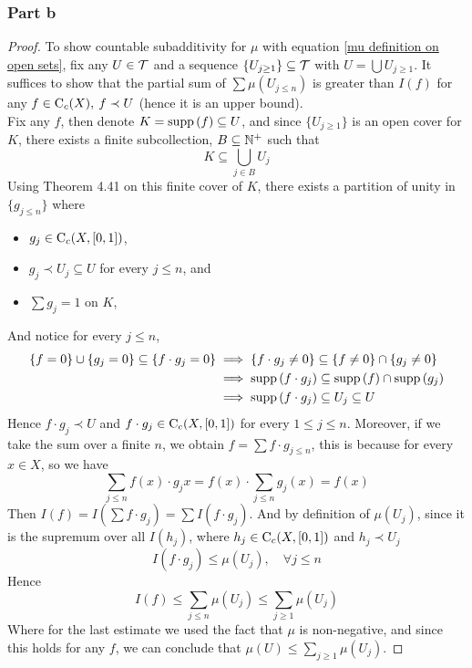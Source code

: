 \documentclass[../../main.tex]{subfiles}
\begin{document}
\subsubsection*{Part b}
\begin{proof}
To show countable subadditivity for $\mu$ with equation \eqref{mu definition on open sets}, fix any $U\in\mathcal{T}$ and a sequence $\{U_{j\geq 1}\}\subseteq \mathcal{T}$ with $U = \bigcup U_{j\geq 1}$. It suffices to show that the partial sum of $\sum \mu(U_{j\leq n})$ is greater than $I(f)$ for any $f\in\operatorname{C}_c({X}),\:f\prec U$ (hence it is an upper bound).\\

Fix any $f$, then denote $K=\operatorname{supp}{(f)}\subseteq U$, and since $\{U_{j\geq 1}\}$ is an open cover for $K$, there exists a finite subcollection, $B\subseteq\mathbb{N}^+$ such that 
\[
K\subseteq \bigcup_{j\in B}U_j
\]
Using Theorem 4.41 on this finite cover of $K$, there exists a partition of unity in $\{g_{j\leq n}\}$ where
\begin{itemize}
    \item $g_j\in\operatorname{C}_c({X,[0,1]})$,
    \item $g_j\prec U_j\subseteq U$ for every $j\leq n$, and
    \item $\sum g_j=1$ on $K$,
\end{itemize}
And notice for every $j\leq n$, 
\begin{align*}
    \{f=0\}\cup\{g_j=0\}\subseteq \{f\cdot g_j=0\}&\implies\{f\cdot g_j\neq 0\}\subseteq \{f\neq 0\}\cap \{g_j\neq 0\}\\
    &\implies \operatorname{supp}{(f\cdot g_j)}\subseteq \operatorname{supp}{(f)}\cap \operatorname{supp}{(g_j)}\\
    &\implies \operatorname{supp}{(f\cdot g_j)}\subseteq U_j\subseteq U
\end{align*}
Hence $f\cdot g_j\prec U$ and $f\cdot g_j\in\operatorname{C}_c({X,[0,1]})$ for every $1\leq j\leq n$. Moreover, if we take the sum over a finite $n$, we obtain $f = \sum f\cdot g_{j\leq n}$, this is because for every $x\in X$, so we have 
\[
\sum_{j\leq n}f(x)\cdot g_j{x} = f(x)\cdot\sum_{j\leq n}g_j(x) = f(x)
\]
Then $I(f) = I(\sum f\cdot g_j) = \sum I(f\cdot g_j)$. And by definition of $\mu(U_j)$, since it is the supremum over all $I(h_j)$, where $h_j\in\operatorname{C}_c({X,[0,1]})$ and $h_j\prec U_j$
\[
I(f\cdot g_j)\leq \mu(U_j),\quad \forall j\leq n
\]
Hence
\[
I(f)\leq \sum_{j\leq n} \mu(U_j)\leq \sum_{j\geq 1}\mu(U_j)
\]
Where for the last estimate we used the fact that $\mu$ is non-negative, and since this holds for any $f$, we can conclude that $\mu(U)\leq \sum_{j\geq 1} \mu(U_j)$.
\end{proof}
\end{document}
